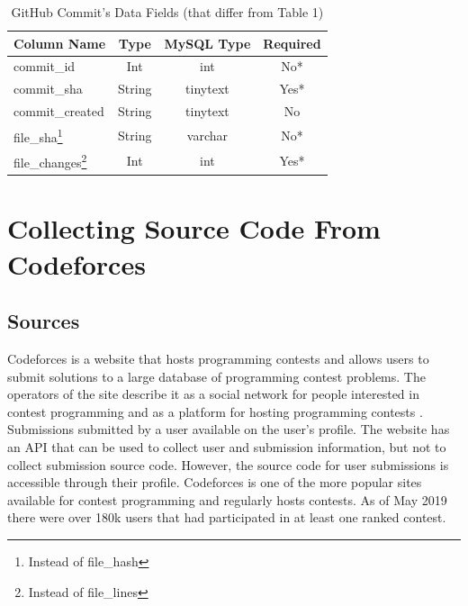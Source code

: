 \documentclass{article}
\begin{document}
\begin{table}[t]
    \begin{center}
        \caption{GitHub Commit's Data Fields (that differ from Table 1)}
        \label{tab:commit_data}
        \begin{tabular}{|l | c | c | c |}
            \hline
            \textbf{Column Name} & \textbf{Type} & \textbf{MySQL Type} & \textbf{Required}\\
            \hline
            commit{\_}id & Int & int & No*\\
            commit{\_}sha & String & tinytext & Yes*\\
            commit{\_}created & String & tinytext & No\\
            file{\_}sha\footnote{Instead of file{\_}hash} & String & varchar & No*\\
            file{\_}changes\footnote{Instead of file{\_}lines} & Int & int & Yes*\\
            \hline
        \end{tabular}
    \end{center}
\end{table}

\section{Collecting Source Code From Codeforces}


\subsection{Sources}
\begin{sloppypar}
Codeforces is a website that hosts programming contests and allows users to submit solutions to a large database of programming contest problems. The operators of the site describe it as a social network for people interested in contest programming and as a platform for hosting programming contests \cite{WEBSITE:CF1}. Submissions submitted by a user available on the user's profile. The website has an API that can be used to collect user and submission information, but not to collect submission source code. However, the source code for user submissions is accessible through their profile. Codeforces is one of the more popular sites available for contest programming and regularly hosts contests. As of May 2019 there were over 180k users that had participated in at least one ranked contest.
\end{sloppypar}
\end{document}
